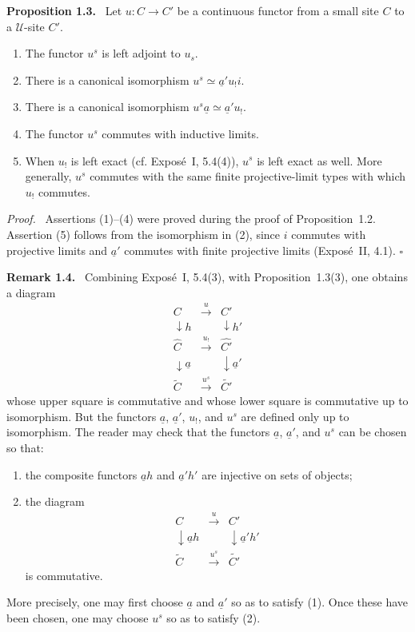 \documentclass[11pt]{article}
\newcommand{\U}{\mathcal{U}}
\newcommand{\qedtext}{\hfill\(\square\)}
\newenvironment{statement}[1]{\par\medskip\noindent\textbf{#1.}\ }{\par\medskip}
\newenvironment{remarktext}[1]{\par\medskip\noindent\textbf{#1.}\ }{\par\medskip}
\newenvironment{prooftext}{\par\noindent\emph{Proof.}\ }{\par\medskip}
\begin{document}
\begin{statement}{Proposition 1.3}
Let \(u:C\to C'\) be a continuous functor from a small site \(C\) to a \(\U\)-site \(C'\).
\begin{enumerate}[label=\arabic*)]
\item The functor \(u^s\) is left adjoint to \(u_s\).
\item There is a canonical isomorphism \(u^s\simeq\underline a'u_!i\).
\item There is a canonical isomorphism \(u^s\underline a\simeq\underline a'u_!\).
\item The functor \(u^s\) commutes with inductive limits.
\item When \(u_!\) is left exact (cf. Expos\'e~I, 5.4(4)), \(u^s\) is left exact as well. More generally, \(u^s\) commutes with the same finite projective-limit types with which \(u_!\) commutes.
\end{enumerate}
\end{statement}

\begin{prooftext}
Assertions (1)--(4) were proved during the proof of Proposition~1.2. Assertion (5) follows from the isomorphism in (2), since \(i\) commutes with projective limits and \(\underline a'\) commutes with finite projective limits (Expos\'e~II, 4.1). \qedtext
\end{prooftext}

\begin{remarktext}{Remark 1.4}
Combining Expos\'e~I, 5.4(3), with Proposition~1.3(3), one obtains a diagram
\[
\begin{array}{ccc}
C & \xrightarrow{u} & C'\\
\downarrow h && \downarrow h'\\
\widehat C & \xrightarrow{u_!} & \widehat{C'}\\
\downarrow\underline a && \downarrow\underline a'\\
\widetilde C & \xrightarrow{u^s} & \widetilde{C'}
\end{array}
\]
whose upper square is commutative and whose lower square is commutative up to isomorphism. But the functors \(\underline a\), \(\underline a'\), \(u_!\), and \(u^s\) are defined only up to isomorphism. The reader may check that the functors \(\underline a\), \(\underline a'\), and \(u^s\) can be chosen so that:
\begin{enumerate}[label=\arabic*)]
\item the composite functors \(\underline ah\) and \(\underline a'h'\) are injective on sets of objects;
\item the diagram
\[
\begin{array}{ccc}
C & \xrightarrow{u} & C'\\
\downarrow\underline ah && \downarrow\underline a'h'\\
\widetilde C & \xrightarrow{u^s} & \widetilde{C'}
\end{array}
\]
is commutative.
\end{enumerate}
More precisely, one may first choose \(\underline a\) and \(\underline a'\) so as to satisfy (1). Once these have been chosen, one may choose \(u^s\) so as to satisfy (2).
\end{remarktext}
\end{document}
